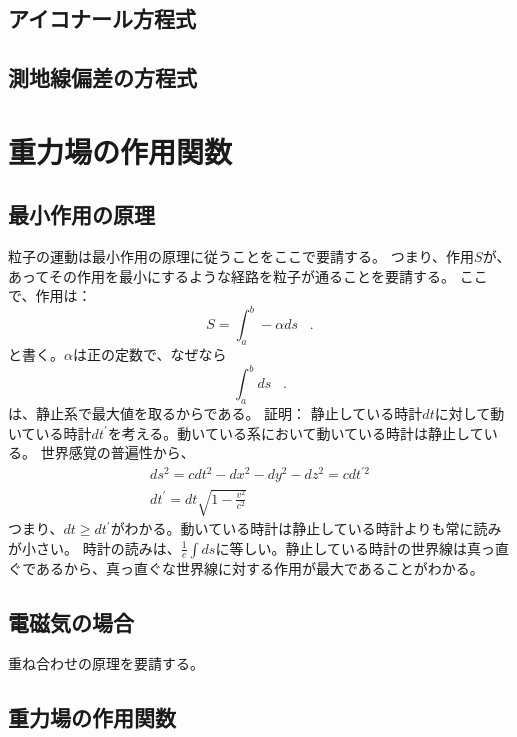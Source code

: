 \documentclass{jsarticle}
\newcommand{\pri}[1]{#1^{\prime}}
\newcommand{\beq}{\begin{equation}}
\newcommand{\beql}[1]{\begin{equation}\label{#1}}
\newcommand{\eeqp}{\;\;\;.\end{equation}}
\begin{document}
\subsection{アイコナール方程式}
\subsection{測地線偏差の方程式}
\section{重力場の作用関数}
\subsection{最小作用の原理}
粒子の運動は最小作用の原理に従うことをここで要請する。
つまり、作用$S$が、あってその作用を最小にするような経路を粒子が通ることを要請する。
ここで、作用は：
\beql{eq:S}
    S = \int_{a}^{b} - \alpha ds
\eeqp
と書く。$\alpha$は正の定数で、なぜなら
\beq \int_a^b ds\eeqp は、静止系で最大値を取るからである。
証明：
静止している時計$dt$に対して動いている時計$\pri{dt}$を考える。動いている系において動いている時計は静止している。
世界感覚の普遍性から、
\begin{align} 
    ds^2 = cdt^2 - dx^2 - dy^2 - dz^2 = cdt^{\prime 2}\\
    \pri{dt} = dt \sqrt{1 - \frac{v^2}{c^2}} 
\end{align}
つまり、$dt \geq \pri{dt}$がわかる。動いている時計は静止している時計よりも常に読みが小さい。
時計の読みは、$\frac{1}{c} \int ds$に等しい。静止している時計の世界線は真っ直ぐであるから、真っ直ぐな世界線に対する作用が最大であることがわかる。
\subsection{電磁気の場合}
重ね合わせの原理を要請する。
\subsection{重力場の作用関数}
\end{document}
